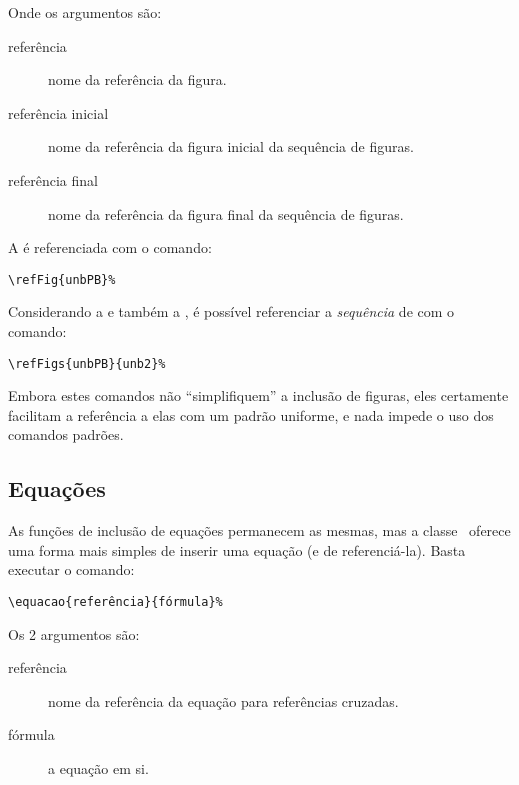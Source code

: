 Onde os argumentos são:
\begin{description}
\item[referência] nome da referência da figura.
\item[referência inicial] nome da referência da figura inicial da sequência de figuras.
\item[referência final] nome da referência da figura final da sequência de figuras.
\end{description}

A  é referenciada com o comando:
\begin{verbatim}
\refFig{unbPB}%
\end{verbatim}

%

Considerando a  e também a , é possível referenciar 
a \emph{sequência} de  com o comando:
\begin{verbatim}
\refFigs{unbPB}{unb2}%
\end{verbatim}

Embora estes comandos não ``simplifiquem'' a inclusão de figuras, eles 
certamente facilitam a referência a elas com um padrão uniforme, e nada impede o 
uso dos comandos padrões.

%



\subsection{Equações}
As funções de inclusão de equações permanecem as mesmas, mas a classe \unbcic\ 
oferece uma forma mais simples de inserir uma equação (e de referenciá-la). Basta 
executar o comando:

\begin{verbatim}
\equacao{referência}{fórmula}%
\end{verbatim}

Os 2 argumentos são:
\begin{description}
\item[referência] nome da referência da equação para referências cruzadas.
\item[fórmula] a equação em si.
\end{description} 

